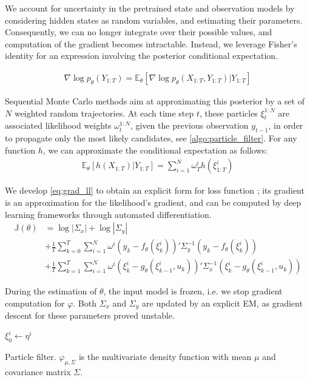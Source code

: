 \documentclass{article}
\begin{document}
We account for uncertainty in the pretrained state and observation models by considering hidden states as random variables, and estimating their parameters.
Consequently, we can no longer integrate over their possible values, and computation of the gradient becomes intractable.
Instead, we leverage Fisher's identity for an expression involving the posterior conditional expectation.

\begin{align}
	\nabla \log p_\theta(Y_{1:T}) = \mathbb{E}_\theta \left[ \nabla\log p_\theta(X_{1:T}, Y_{1:T}) | Y_{1:T} \right]
	\label{eq:grad_ll}
\end{align}

Sequential Monte Carlo methods aim at approximating this posterior by a set of $N$ weighted random trajectories.
At each time step $t$, these particles $\xi^{1:N}_t$ are associated likelihood weights $\omega^{1:N}_t$, given the previous observation $y_{t-1}$, in order to propagate only the most likely candidates, see \ref{algo:particle_filter}.
For any function $h$, we can approximate the conditional expectation as follows:
\begin{align*}
	\mathbb{E}_\theta \left[ h(X_{1:T}) | Y_{1:T} \right] = \sum_{i=1}^N \omega_T^i h(\xi^i_{1:T})
\end{align*}

We develop \ref{eq:grad_ll} to obtain an explicit form for loss function ; its gradient is an approximation for the likelihood's gradient, and can be computed by deep learning frameworks through automated differentiation.
\begin{align*}
	\mathbb{J}(\theta) & = \log |\Sigma_x| + \log |\Sigma_y|                                                                                                        \\
	                   & + \frac{1}{T}\sum_{k=0}^T \sum_{i=1}^N \omega^i (y_k - f_\theta(\xi_k^i))' \Sigma_y^{-1} (y_k - f_\theta(\xi_k^i))                         \\
	                   & + \frac{1}{T}\sum_{k=1}^T \sum_{i=1}^N \omega^i (\xi_k^i - g_\theta(\xi_{k-1}^i, u_k))'\Sigma_x^{-1}(\xi_k^i - g_\theta(\xi_{k-1}^i, u_k))
\end{align*}

During the estimation of $\theta$, the input model is frozen, i.e. we stop gradient computation for $\varphi$. Both $\Sigma_x$ and $\Sigma_y$ are updated by an explicit EM, as gradient descent for these parameters proved unstable.

\begin{algorithm}
	$\xi_0^i \gets \eta^i$\;
	\caption{Particle filter. $\varphi_{\mu, \Sigma}$ is the multivariate density function with mean $\mu$ and covariance matrix $\Sigma$.}
	\label{algo:particle_filter}
\end{algorithm}
\end{document}
